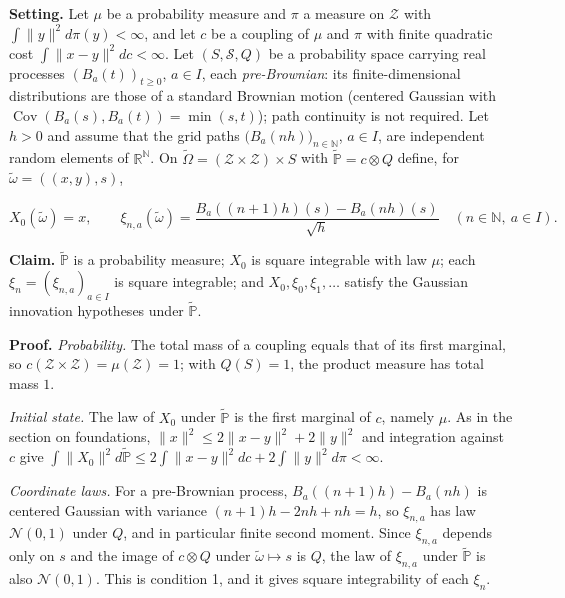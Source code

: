 \documentclass[11pt,a4paper]{article}
\begin{document}
\textbf{Setting.} Let \(\mu\) be a probability measure and \(\pi\) a measure on \(\mathcal Z\) with \(\int\|y\|^2d\pi(y)<\infty\), and let \(c\) be a coupling of \(\mu\) and \(\pi\) with finite quadratic cost \(\int\|x-y\|^2dc<\infty\). Let \((S,\mathcal S,Q)\) be a probability space carrying real processes \((B_a(t))_{t\ge0}\), \(a\in I\), each \emph{pre-Brownian}: its finite-dimensional distributions are those of a standard Brownian motion (centered Gaussian with \(\operatorname{Cov}(B_a(s),B_a(t))=\min(s,t)\)); path continuity is not required. Let \(h>0\) and assume that the grid paths \(\bigl(B_a(nh)\bigr)_{n\in\mathbb N}\), \(a\in I\), are independent random elements of \(\mathbb R^{\mathbb N}\). On \(\tilde\Omega=(\mathcal Z\times\mathcal Z)\times S\) with \(\tilde{\mathbb P}=c\otimes Q\) define, for \(\tilde\omega=((x,y),s)\),


\[X_0(\tilde\omega)=x,\qquad\xi_{n,a}(\tilde\omega)=\frac{B_a((n+1)h)(s)-B_a(nh)(s)}{\sqrt h}\quad(n\in\mathbb N,\ a\in I).\]


\textbf{Claim.} \(\tilde{\mathbb P}\) is a probability measure; \(X_0\) is square integrable with law \(\mu\); each \(\xi_n=(\xi_{n,a})_{a\in I}\) is square integrable; and \(X_0,\xi_0,\xi_1,\dots\) satisfy the Gaussian innovation hypotheses under \(\tilde{\mathbb P}\).




\textbf{Proof.} \emph{Probability.} The total mass of a coupling equals that of its first marginal, so \(c(\mathcal Z\times\mathcal Z)=\mu(\mathcal Z)=1\); with \(Q(S)=1\), the product measure has total mass \(1\).




\emph{Initial state.} The law of \(X_0\) under \(\tilde{\mathbb P}\) is the first marginal of \(c\), namely \(\mu\). As in the section on foundations, \(\|x\|^2\le2\|x-y\|^2+2\|y\|^2\) and integration against \(c\) give \(\int\|X_0\|^2d\tilde{\mathbb P}\le2\int\|x-y\|^2dc+2\int\|y\|^2d\pi<\infty\).




\emph{Coordinate laws.} For a pre-Brownian process, \(B_a((n+1)h)-B_a(nh)\) is centered Gaussian with variance \((n+1)h-2nh+nh=h\), so \(\xi_{n,a}\) has law \(\mathcal N(0,1)\) under \(Q\), and in particular finite second moment. Since \(\xi_{n,a}\) depends only on \(s\) and the image of \(c\otimes Q\) under \(\tilde\omega\mapsto s\) is \(Q\), the law of \(\xi_{n,a}\) under \(\tilde{\mathbb P}\) is also \(\mathcal N(0,1)\). This is condition 1, and it gives square integrability of each \(\xi_n\).
\end{document}

